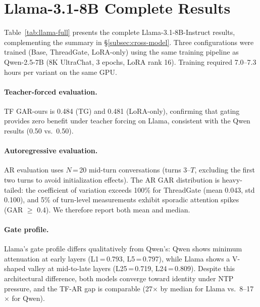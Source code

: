 \section{Llama-3.1-8B Complete Results}\label{sec:appendix-llama}

Table~\ref{tab:llama-full} presents the complete Llama-3.1-8B-Instruct results, complementing the summary in \S\ref{subsec:cross-model}. Three configurations were trained (Base, ThreadGate, LoRA-only) using the same training pipeline as Qwen-2.5-7B (8K UltraChat, 3 epochs, LoRA rank 16). Training required 7.0--7.3 hours per variant on the same GPU.

\paragraph{Teacher-forced evaluation.} TF GAR-ours is 0.484 (TG) and 0.481 (LoRA-only), confirming that gating provides zero benefit under teacher forcing on Llama, consistent with the Qwen results (0.50 vs.\ 0.50).

\paragraph{Autoregressive evaluation.} AR evaluation uses $N$\,=\,20 mid-turn conversations (turns 3--$T$, excluding the first two turns to avoid initialization effects). The AR GAR distribution is heavy-tailed: the coefficient of variation exceeds 100\% for ThreadGate (mean 0.043, std 0.100), and 5\% of turn-level measurements exhibit sporadic attention spikes (GAR $\geq$ 0.4). We therefore report both mean and median.

\paragraph{Gate profile.} Llama's gate profile differs qualitatively from Qwen's: Qwen shows minimum attenuation at early layers (L1\,=\,0.793, L5\,=\,0.797), while Llama shows a V-shaped valley at mid-to-late layers (L25\,=\,0.719, L24\,=\,0.809). Despite this architectural difference, both models converge toward identity under NTP pressure, and the TF-AR gap is comparable (27$\times$ by median for Llama vs.\ 8--17$\times$ for Qwen).

